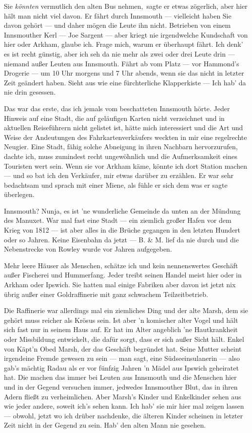 \glqq Sie \textit{könnten} vermutlich den alten Bus nehmen,\grqq\ sagte er etwas zögerlich, \glqq aber hier hält man nicht viel davon. Er fährt durch Innsmouth --- vielleicht haben Sie davon gehört --- und daher mögen die Leute ihn nicht. Betrieben von einem Innsmouther Kerl --- Joe Sargent --- aber kriegt nie irgendwelche Kundschaft von hier oder Arkham, glaube ich. Frage mich, warum er überhaupt fährt. Ich denk' es ist recht günstig, aber ich seh da nie mehr als zwei oder drei Leute drin --- niemand außer Leuten aus Innsmouth. Fährt ab vom Platz --- vor Hammond's Drogerie --- um 10 Uhr morgens und 7 Uhr abends, wenn sie das nicht in letzter Zeit geändert haben. Sieht aus wie eine fürchterliche Klapperkiste --- Ich hab' da nie drin gesessen.\grqq

Das war das erste, das ich jemals vom beschatteten Innsmouth hörte. Jeder Hinweis auf eine Stadt, die auf geläufigen Karten nicht verzeichnet und in aktuellen Reiseführern nicht gelistet ist, hätte mich interessiert und die Art und Weise der Andeutungen des Fahrkartenverkäufers weckten in mir eine regelrechte Neugier. Eine Stadt, fähig solche Abneigung in ihren Nachbarn hervorzurufen, dachte ich, muss zumindest recht ungewöhnlich und die Aufmerksamkeit eines Touristen wert sein. Wenn sie vor Arkham käme, könnte ich dort Station machen --- und so bat ich den Verkäufer, mir etwas darüber zu erzählen. Er war sehr bedachtsam und sprach mit einer Miene, als fühle er sich dem was er sagte überlegen.

\glqq Innsmouth? Nunja, es ist 'ne wunderliche Gemeinde da unten an der Mündung des Manuxet. War mal fast eine Stadt --- ein ziemlich großer Hafen vor dem Krieg von 1812 --- ist aber alles in die Brüche gegangen in den letzten Hundert oder so Jahren. Keine Eisenbahn da jetzt --- B. \& M. lief da nie durch und die Nebenstrecke von Rowley wurde vor Jahren aufgegeben.

Mehr leere Häuser als Menschen, schätze ich und kein nennenswertes Geschäft außer Fischerei und Hummerfang. Jeder treibt seinen Handel meist hier oder in Arkham oder Ipswich. Sie hatten mal einige Fabriken aber davon ist jetzt nix übrig außer einer Goldraffinerie mit ganz schwachem Teilzeitbetrieb.

Die Raffinerie war allerdings mal ein ziemliches Ding und der alte Marsh, dem sie gehört muss reicher als Krösus sein. Ist aber 'n komischer alter Vogel und hält sich fast nur in seinem Haus auf. Er hat im Alter angeblich 'ne Hautkrankheit oder Missbildung entwickelt, die dafür sorgt, dass er sich außer Sicht hält. Enkel von Käpt'n Obed Marsh, der das Geschäft begründet hat. Seine Mutter scheint irgendeine Fremde gewesen  zu sein --- man sagt, eine Südseeinsulanerin --- also gab's mächtig Radau als er vor fünfzig Jahren 'n Mädel aus Ipswich geheiratet hat. Die machen das immer bei Leuten aus Innsmouth und die Menschen hier und in der Gegend versuchen immer, jedwedes Innsmouther Blut, das in ihren Adern fließt zu verheimlichen. Aber Marsh's Kinder und Enkelkinder sehen aus wie jeder andere, soweit ich's sehen kann. Ich hab' sie mir hier mal zeigen lassen --- obwohl, jetzt wo ich drüber nachdenke, die älteren Kinder scheinen in letzter Zeit nicht in der Gegend zu sein. Hab' den alten Mann nie gesehen.

